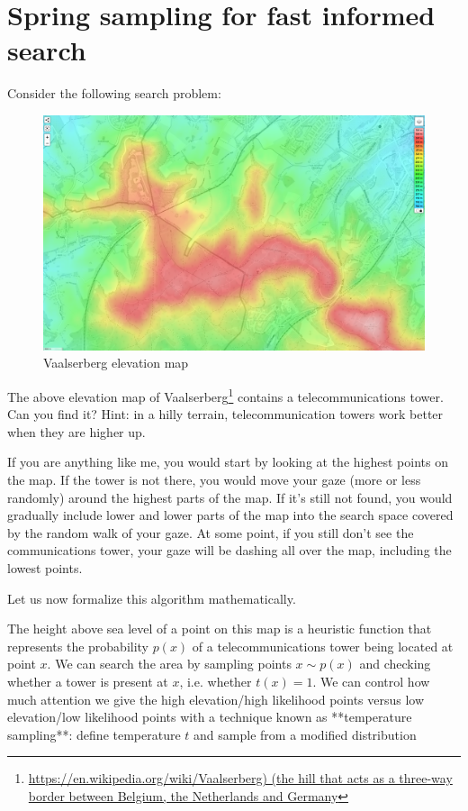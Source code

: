 \section{Spring sampling for fast informed search}

Consider the following search problem:

\begin{figure}
    \centering
    \includegraphics[width=0.8\linewidth]{images/vaalserberg_lost.png}
    \caption{Vaalserberg elevation map}
\end{figure}


The above elevation map of Vaalserberg\footnote{\url{https://en.wikipedia.org/wiki/Vaalserberg) (the hill that acts as a three-way border between Belgium, the Netherlands and Germany}} contains a telecommunications tower. Can you find it? Hint: in a hilly terrain, telecommunication towers work better when they are higher up.

If you are anything like me, you would start by looking at the highest points on the map.
If the tower is not there, you would move your gaze (more or less randomly) around the highest parts of the map.
If it's still not found, you would gradually include lower and lower parts of the map into the search space covered by the random walk of your gaze.
At some point, if you still don't see the communications tower, your gaze will be dashing all over the map, including the lowest points.

Let us now formalize this algorithm mathematically.

The height above sea level of a point on this map is a heuristic function that represents the probability $p(x)$ of a telecommunications tower being located at point $x$.
We can search the area by sampling points $x \sim p(x)$ and checking whether a tower is present at $x$, i.e. whether $t(x)=1$.
We can control how much attention we give the high elevation/high likelihood points versus low elevation/low likelihood points with a technique known as **temperature sampling**: define temperature $t$ and sample from a modified distribution

